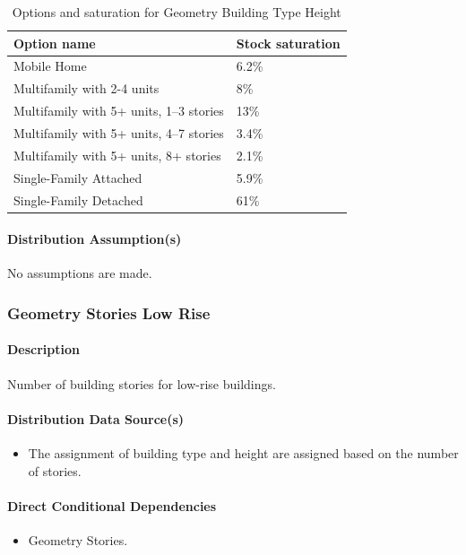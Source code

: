\begin{longtable}[]{@{}ll@{}}
\caption{Options and saturation for Geometry Building Type Height} \\
\toprule\noalign{}
Option name & Stock saturation \\
\midrule\noalign{}
\endhead
\bottomrule\noalign{}
\endlastfoot
Mobile Home & 6.2\% \\
Multifamily with 2-4 units & 8\% \\
Multifamily with 5+ units, 1--3 stories & 13\% \\
Multifamily with 5+ units, 4--7 stories & 3.4\% \\
Multifamily with 5+ units, 8+ stories & 2.1\% \\
Single-Family Attached & 5.9\% \\
Single-Family Detached & 61\% \\
\end{longtable}

\paragraph{Distribution Assumption(s)}
No assumptions are made.

\subsubsection{Geometry Stories Low Rise}
\paragraph{Description}
Number of building stories for low-rise buildings.

\paragraph{Distribution Data Source(s)}
\begin{itemize}
    \item The assignment of building type and height are assigned based on the number of stories.
\end{itemize}

\paragraph{Direct Conditional Dependencies}
\begin{itemize}
    \item Geometry Stories.
\end{itemize}

